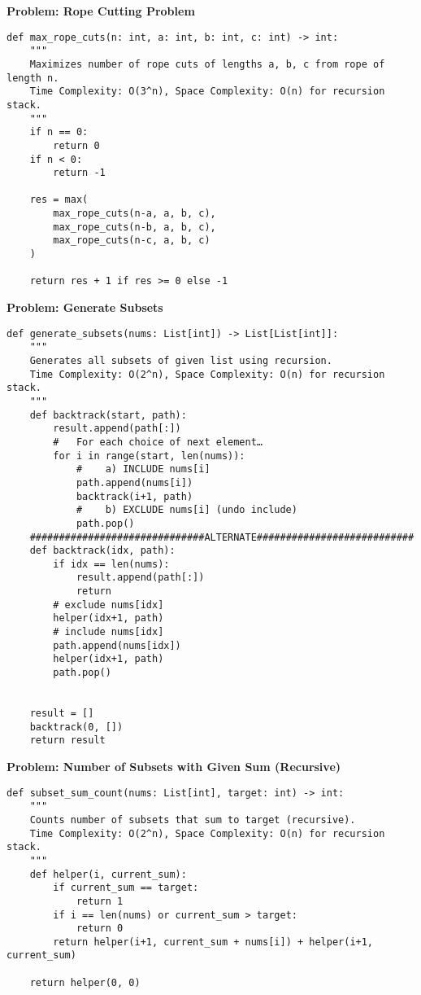 \noindent\textbf{Problem: Rope Cutting Problem}
\begin{verbatim}
def max_rope_cuts(n: int, a: int, b: int, c: int) -> int:
    """
    Maximizes number of rope cuts of lengths a, b, c from rope of length n.
    Time Complexity: O(3^n), Space Complexity: O(n) for recursion stack.
    """
    if n == 0:
        return 0
    if n < 0:
        return -1
        
    res = max(
        max_rope_cuts(n-a, a, b, c),
        max_rope_cuts(n-b, a, b, c),
        max_rope_cuts(n-c, a, b, c)
    )
    
    return res + 1 if res >= 0 else -1
\end{verbatim}

\noindent\textbf{Problem: Generate Subsets}
\begin{verbatim}
def generate_subsets(nums: List[int]) -> List[List[int]]:
    """
    Generates all subsets of given list using recursion.
    Time Complexity: O(2^n), Space Complexity: O(n) for recursion stack.
    """
    def backtrack(start, path):
        result.append(path[:])
        #   For each choice of next element…
        for i in range(start, len(nums)):
            #    a) INCLUDE nums[i]
            path.append(nums[i])
            backtrack(i+1, path)
            #    b) EXCLUDE nums[i] (undo include)
            path.pop()
    ##############################ALTERNATE###########################
    def backtrack(idx, path):
        if idx == len(nums):
            result.append(path[:])
            return
        # exclude nums[idx]
        helper(idx+1, path)
        # include nums[idx]
        path.append(nums[idx])
        helper(idx+1, path)
        path.pop()

            
    result = []
    backtrack(0, [])
    return result
\end{verbatim}

\noindent\textbf{Problem: Number of Subsets with Given Sum (Recursive)}
\begin{verbatim}
def subset_sum_count(nums: List[int], target: int) -> int:
    """
    Counts number of subsets that sum to target (recursive).
    Time Complexity: O(2^n), Space Complexity: O(n) for recursion stack.
    """
    def helper(i, current_sum):
        if current_sum == target:
            return 1
        if i == len(nums) or current_sum > target:
            return 0
        return helper(i+1, current_sum + nums[i]) + helper(i+1, current_sum)
        
    return helper(0, 0)
\end{verbatim}

